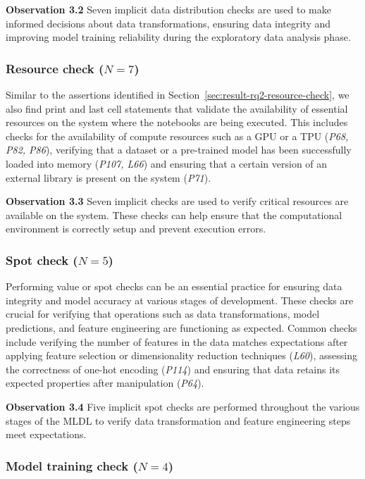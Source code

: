\documentclass[smallextended]{svjour3}       %
\newcommand{\highlight}[1]{\begin{framed}%
  \noindent#1
\end{framed}}
\begin{document}
\highlight{\textbf{Observation 3.2} Seven implicit data distribution checks are used to make informed decisions about data transformations, ensuring data integrity and improving model training reliability during the exploratory data analysis phase.}

\subsubsection{Resource check ($N = 7$)}\label{sec:implicit-resource-check}

Similar to the assertions identified in Section~\ref{sec:result-rq2-resource-check}, we also find print and last cell statements that validate the availability of essential resources on the system where the notebooks are being executed. This includes checks for the availability of compute resources such as a GPU or a TPU (\emph{P68, P82, P86}), verifying that a dataset or a pre-trained model has been successfully loaded into memory (\emph{P107, L66}) and ensuring that a certain version of an external library is present on the system (\emph{P71}).

\highlight{\textbf{Observation 3.3} Seven implicit checks are used to verify critical resources are available on the system. These checks can help ensure that the computational environment is correctly setup and prevent execution errors.}

\subsubsection{Spot check ($N = 5$)}

Performing value or spot checks can be an essential practice for ensuring data integrity and model accuracy at various stages of development. These checks are crucial for verifying that operations such as data transformations, model predictions, and feature engineering are functioning as expected. Common checks include verifying the number of features in the data matches expectations after applying feature selection or dimensionality reduction techniques (\emph{L60}), assessing the correctness of one-hot encoding (\emph{P114}) and ensuring that data retains its expected properties after manipulation (\emph{P64}).

\highlight{\textbf{Observation 3.4} Five implicit spot checks are performed throughout the various stages of the MLDL to verify data transformation and feature engineering steps meet expectations.}

\subsubsection{Model training check ($N = 4$)}
\end{document}

